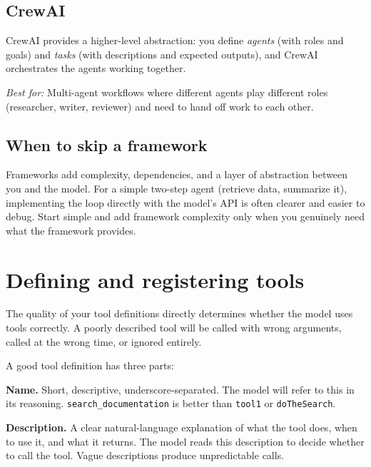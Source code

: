 \subsection{CrewAI}

CrewAI provides a higher-level abstraction: you define \emph{agents} (with roles and goals) and \emph{tasks} (with descriptions and expected outputs), and CrewAI orchestrates the agents working together.

\emph{Best for:} Multi-agent workflows where different agents play different roles (researcher, writer, reviewer) and need to hand off work to each other.

\subsection{When to skip a framework}

Frameworks add complexity, dependencies, and a layer of abstraction between you and the model. For a simple two-step agent (retrieve data, summarize it), implementing the loop directly with the model's API is often clearer and easier to debug. Start simple and add framework complexity only when you genuinely need what the framework provides.


\section{Defining and registering tools}

The quality of your tool definitions directly determines whether the model uses tools correctly. A poorly described tool will be called with wrong arguments, called at the wrong time, or ignored entirely.

A good tool definition has three parts:

\textbf{Name.} Short, descriptive, underscore-separated. The model will refer to this in its reasoning. \texttt{search\_documentation} is better than \texttt{tool1} or \texttt{doTheSearch}.

\textbf{Description.} A clear natural-language explanation of what the tool does, when to use it, and what it returns. The model reads this description to decide whether to call the tool. Vague descriptions produce unpredictable calls.

